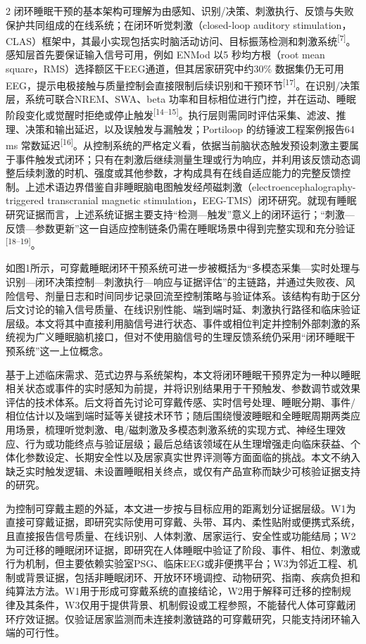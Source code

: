 \documentclass[UTF8,zihao=5,fontset=none]{ctexart}
\newcommand{\hei}{\CJKfamily{hei}}
\newcommand{\leveltwo}[1]{%
  \par\noindent{\hei\fontsize{10pt}{12pt}\selectfont\bfseries #1\par}}
\newcommand{\refcite}[1]{\nolinebreak[4]\textsuperscript{[#1]}}
\begin{document}
\begin{multicols}{2}
闭环睡眠干预的基本架构可理解为由感知、识别/决策、刺激执行、反馈与失败保护共同组成的在线系统；在闭环听觉刺激（closed-loop auditory stimulation，CLAS）框架中，其最小实现包括实时脑活动访问、目标振荡检测和刺激系统\refcite{7}。感知层首先要保证输入信号可用，例如 ENMod 以5 秒均方根（root mean square，RMS）选择额区干EEG通道，但其居家研究中约30\% 数据集仍无可用EEG，提示电极接触与质量控制会直接限制后续识别和干预环节\refcite{17}。在识别/决策层，系统可联合NREM、SWA、beta 功率和目标相位进行门控，并在运动、睡眠阶段变化或觉醒时拒绝或停止触发\refcite{14--15}。执行层则需同时评估采集、滤波、推理、决策和输出延迟，以及误触发与漏触发；Portiloop 的纺锤波工程案例报告64 ms 常数延迟\refcite{16}。从控制系统的严格定义看，依据当前脑状态触发预设刺激主要属于事件触发式闭环；只有在刺激后继续测量生理或行为响应，并利用该反馈动态调整后续刺激的时机、强度或其他参数，才构成具有在线自适应能力的完整反馈控制。上述术语边界借鉴自非睡眠脑电图触发经颅磁刺激（electroencephalography-triggered transcranial magnetic stimulation，EEG-TMS）闭环研究。就现有睡眠研究证据而言，上述系统证据主要支持“检测—触发”意义上的闭环运行；“刺激—反馈—参数更新”这一自适应控制链条仍需在睡眠场景中得到完整实现和充分验证\refcite{18--19}。

如图1所示，可穿戴睡眠闭环干预系统可进一步被概括为“多模态采集—实时处理与识别—闭环决策控制—刺激执行—响应与证据评估”的主链路，并通过失败夜、风险信号、剂量日志和时间同步记录回流至控制策略与验证体系。该结构有助于区分后文讨论的输入信号质量、在线识别性能、端到端时延、刺激执行路径和临床验证层级。本文将其中直接利用脑信号进行状态、事件或相位判定并控制外部刺激的系统视为广义睡眠脑机接口，但对不使用脑信号的生理反馈系统仍采用“闭环睡眠干预系统”这一上位概念。\par

\leveltwo{1.4 本文综述范围与结构安排}

基于上述临床需求、范式边界与系统架构，本文将闭环睡眠干预界定为一种以睡眠相关状态或事件的实时感知为前提，并将识别结果用于干预触发、参数调节或效果评估的技术体系。后文将首先讨论可穿戴传感、实时信号处理、睡眠分期、事件/相位估计以及端到端时延等关键技术环节；随后围绕慢波睡眠和全睡眠周期两类应用场景，梳理听觉刺激、电/磁刺激及多模态刺激系统的实现方式、神经生理效应、行为或功能终点与验证层级；最后总结该领域在从生理增强走向临床获益、个体化参数设定、长期安全性以及居家真实世界评测等方面面临的挑战。本文不纳入缺乏实时触发逻辑、未设置睡眠相关终点，或仅有产品宣称而缺少可核验证据支持的研究。

为控制可穿戴主题的外延，本文进一步按与目标应用的距离划分证据层级。W1为直接可穿戴证据，即研究实际使用可穿戴、头带、耳内、柔性贴附或便携式系统，且直接报告信号质量、在线识别、人体刺激、居家运行、安全性或功能结局；W2为可迁移的睡眠闭环证据，即研究在人体睡眠中验证了阶段、事件、相位、刺激或行为机制，但主要依赖实验室PSG、临床EEG或非便携平台；W3为邻近工程、机制或背景证据，包括非睡眠闭环、开放环环境调控、动物研究、指南、疾病负担和纯算法方法。W1用于形成可穿戴系统的直接结论，W2用于解释可迁移的控制规律及其条件，W3仅用于提供背景、机制假设或工程参照，不能替代人体可穿戴闭环疗效证据。仅验证居家监测而未连接刺激链路的可穿戴研究，只能支持闭环输入端的可行性。


\end{multicols}
\end{document}
